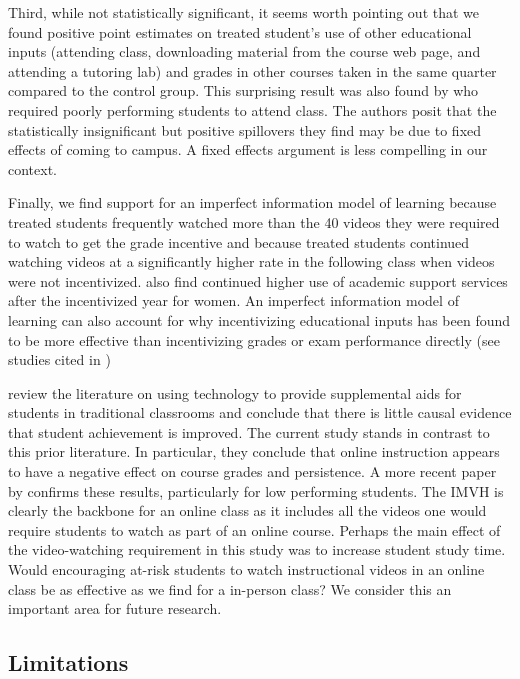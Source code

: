 \documentclass[12pt]{article}
\begin{document}
Third, while not statistically significant, it seems worth pointing out that we found positive point estimates on treated student's use of other educational inputs (attending class, downloading material from the course web page, and attending a tutoring lab) and grades in other courses taken in the same quarter compared to the control group. This surprising result was also found by \textcite{dgm2010} who required poorly performing students to attend class. The authors posit that the statistically insignificant but positive spillovers they find may be due to fixed effects of coming to campus. A fixed effects argument is less compelling in our context.

Finally, we find support for an imperfect information model of learning because treated students frequently watched more than the 40 videos they were required to watch to get the grade incentive and because treated students continued watching videos at a significantly higher rate in the following class when videos were not incentivized. \textcite{alo2009} also find continued higher use of academic support services after the incentivized year for women. An imperfect information model of learning can also account for why incentivizing educational inputs has been found to be more effective than incentivizing grades or exam performance directly (see studies cited in \textcite{gmr2011})

\textcite{aws2015} review the literature on using technology to provide supplemental aids for students in traditional classrooms and conclude that there is little causal evidence that student achievement is improved. The current study stands in contrast to this prior literature. In particular, they conclude that online instruction appears to have a negative effect on course grades and persistence. A more recent paper by \textcite{bflt2017} confirms these results, particularly for low performing students. The IMVH is clearly the backbone for an online class as it includes all the videos one would require students to watch as part of an online course. Perhaps the main effect of the video-watching requirement in this study was to increase student study time. Would encouraging at-risk students to watch instructional videos in an online class be as effective as we find for a in-person class? We consider this an important area for future research.


\subsection{Limitations}
\end{document}
